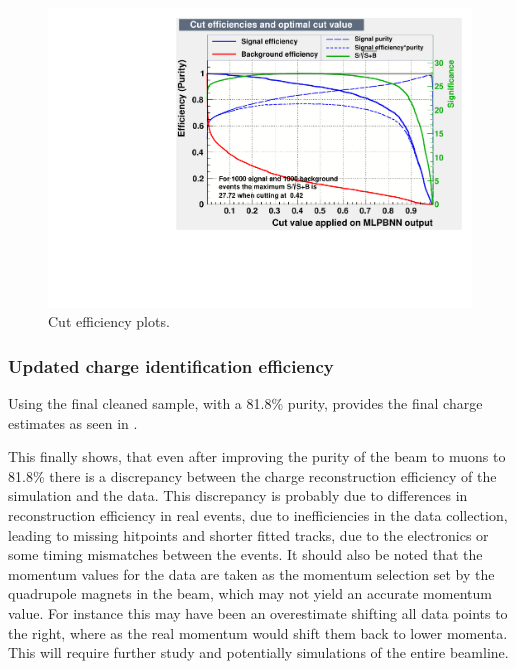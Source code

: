 \begin{figure}[h!]
\centering

\includegraphics[width=\textwidth]{figures/TMVA/Cuts.pdf}
\caption{Cut efficiency plots.}
\label{fig:TMVAcuts}
\end{figure}




\clearpage
\subsubsection{Updated charge identification efficiency}

Using the final cleaned sample, with a 81.8\% purity, provides the final charge estimates as seen in .

This finally shows, that even after improving the purity of the beam to muons to 81.8\% there is a discrepancy between the charge reconstruction efficiency of the simulation and the data. This discrepancy is probably due to differences in reconstruction efficiency in real events, due to inefficiencies in the data collection, leading to missing hitpoints and shorter fitted tracks, due to the electronics or some timing mismatches between the events. It should also be noted that the momentum values for the data are taken as the momentum selection set by the quadrupole magnets in the beam, which may not yield an accurate momentum value. For instance this may have been an overestimate shifting all data points to the right, where as the real momentum would shift them back to lower momenta. This will require further study and potentially simulations of the entire beamline.

